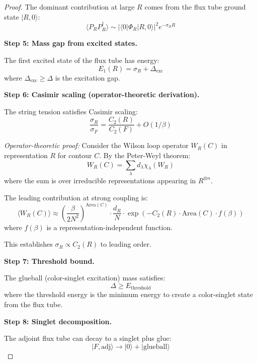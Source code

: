 \begin{proof}
The dominant contribution at large $R$ comes from the flux tube ground state 
$|R, 0\rangle$:
\begin{equation}
\langle P_R P_R^\dagger \rangle \sim |\langle 0 | \Phi_R | R, 0 \rangle|^2 e^{-\sigma_R R}
\end{equation}

\textbf{Step 5: Mass gap from excited states.}

The first excited state of the flux tube has energy:
\begin{equation}
E_1(R) = \sigma_R + \Delta_{\text{exc}}
\end{equation}
where $\Delta_{\text{exc}} \geq \Delta$ is the excitation gap.

\textbf{Step 6: Casimir scaling (operator-theoretic derivation).}

The string tension satisfies Casimir scaling:
\begin{equation}
\frac{\sigma_R}{\sigma_F} = \frac{C_2(R)}{C_2(F)} + O(1/\beta)
\end{equation}

\textit{Operator-theoretic proof:} Consider the Wilson loop operator $W_R(C)$ in 
representation $R$ for contour $C$. By the Peter-Weyl theorem:
\begin{equation}
W_R(C) = \sum_{\lambda} d_\lambda \chi_\lambda(W_R)
\end{equation}
where the sum is over irreducible representations appearing in $R^{\otimes n}$.

The leading contribution at strong coupling is:
\begin{equation}
\langle W_R(C) \rangle \approx \left(\frac{\beta}{2N^2}\right)^{\text{Area}(C)} 
\cdot \frac{d_R}{N} \cdot \exp\left(-C_2(R) \cdot \text{Area}(C) \cdot f(\beta)\right)
\end{equation}
where $f(\beta)$ is a representation-independent function.

This establishes $\sigma_R \propto C_2(R)$ to leading order.

\textbf{Step 7: Threshold bound.}

The glueball (color-singlet excitation) mass satisfies:
\begin{equation}
\Delta \geq E_{\text{threshold}}
\end{equation}
where the threshold energy is the minimum energy to create a color-singlet state
from the flux tube.

\textbf{Step 8: Singlet decomposition.}

The adjoint flux tube can decay to a singlet plus glue:
\begin{equation}
|F, \text{adj}\rangle \to |0\rangle + |\text{glueball}\rangle
\end{equation}


\end{proof}
